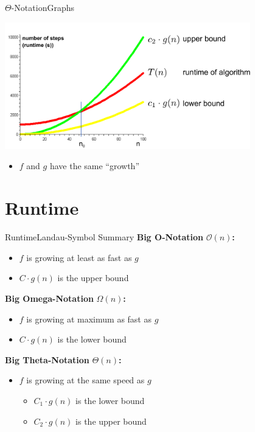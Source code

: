 \begin{frame}{$\Theta$-Notation}{Graphs}
     \begin{center}
       \includegraphics[width=0.8\textwidth]{Images/lower-upper-bound.pdf}
  \end{center}
  \begin{itemize}
  \item $f$ and $g$ have the same ``growth''
  \end{itemize}
\end{frame}

\section{Runtime}


\begin{frame}{Runtime}{Landau-Symbol Summary}
  \textbf{Big O-Notation} $\mathcal{O}(n)$\textbf{:}\\
    \begin{itemize}
      \item
        $f$ is growing {\color{Mittel-Blau}at least} as fast as $g$
      \item
        $C \cdot g(n)$ is the upper bound
    \end{itemize}
  \textbf{Big Omega-Notation} $\Omega(n)$\textbf{:}\\
  \begin{itemize}
    \item
      $f$ is growing {\color{Mittel-Blau}at maximum} as fast as $g$
    \item
      $C \cdot g(n)$ is the lower bound
  \end{itemize}
  \textbf{Big Theta-Notation} $\Theta(n)$\textbf{:}\\
  \begin{itemize}
    \item
      $f$ is growing at {\color{Mittel-Blau}the same} speed as $g$
      \begin{itemize}
        \item
          $C_1 \cdot g(n)$ is the lower bound
        \item
          $C_2 \cdot g(n)$ is the upper bound
      \end{itemize}
  \end{itemize}
\end{frame}

